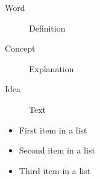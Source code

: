 \documentclass[
10pt, %
a4paper, %
oneside, %
headinclude,footinclude, %
BCOR5mm, %
]{scrartcl}
\begin{document}
\lipsum[12] %

\begin{description}
\item[Word] Definition
\item[Concept] Explanation
\item[Idea] Text
\end{description}

\lipsum[12] %

\begin{itemize}[noitemsep] %
\item First item in a list
\item Second item in a list
\item Third item in a list
\end{itemize}








%


\end{document}

